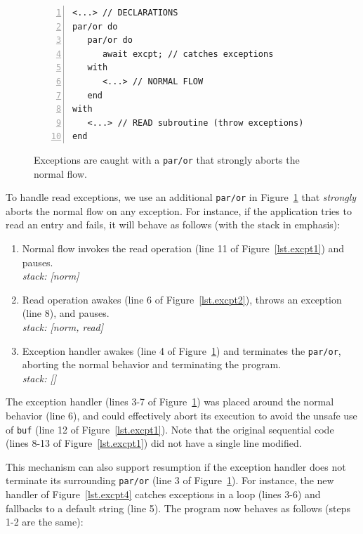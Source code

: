 \documentclass{acm_proc_article-sp}
\newcommand{\code}[1] {{\small{\texttt{#1}}}}
\newcommand{\1}{\;}
\newcommand{\2}{\;\;}
\newcommand{\3}{\;\;\;}
\newcommand{\5}{\;\;\;\;\;}
\begin{document}
\begin{figure}[t]
\begin{lstlisting}[numbers=left,xleftmargin=2em]
<...> // DECLARATIONS
par/or do
   par/or do
      await excpt; // catches exceptions
   with
      <...> // NORMAL FLOW
   end
with
   <...> // READ subroutine (throw exceptions)
end
\end{lstlisting}
\caption{ Exceptions are caught with a \code{par/or} that strongly aborts the 
normal flow.
\label{lst.excpt3}
}
\end{figure}

To handle read exceptions, we use an additional \code{par/or} in 
Figure~\ref{lst.excpt3} that \emph{strongly} aborts the normal flow on any 
exception.
For instance, if the application tries to read an entry and fails, it will 
behave as follows (with the stack in emphasis):

{\small
\begin{enumerate}
\setlength{\itemsep}{0pt}
\item Normal flow invokes the read operation (line 11 of 
    Figure~\ref{lst.excpt1}) and pauses.\\
    \emph{stack: [norm]}
\item Read operation awakes (line 6 of Figure~\ref{lst.excpt2}), throws an 
    exception (line 8), and pauses.\\
    \emph{stack: [norm, read]}
\item Exception handler awakes (line 4 of Figure~\ref{lst.excpt3}) and 
terminates the \code{par/or}, aborting the normal behavior and terminating the 
program. \\
    \emph{stack: []}
\end{enumerate}
}

The exception handler (lines 3-7 of Figure~\ref{lst.excpt3}) was placed around 
the normal behavior (line 6), and could effectively abort its execution to 
avoid the unsafe use of \code{buf} (line 12 of Figure~\ref{lst.excpt1}).
%
Note that the original sequential code (lines 8-13 of Figure~\ref{lst.excpt1}) 
did not have a single line modified.

This mechanism can also support resumption if the exception handler does not 
terminate its surrounding \code{par/or} (line 3 of Figure~\ref{lst.excpt3}).
For instance, the new handler of Figure~\ref{lst.excpt4} catches exceptions in 
a loop (lines 3-6) and fallbacks to a default string (line 5).
The program now behaves as follows (steps 1-2 are the same):
\end{document}
